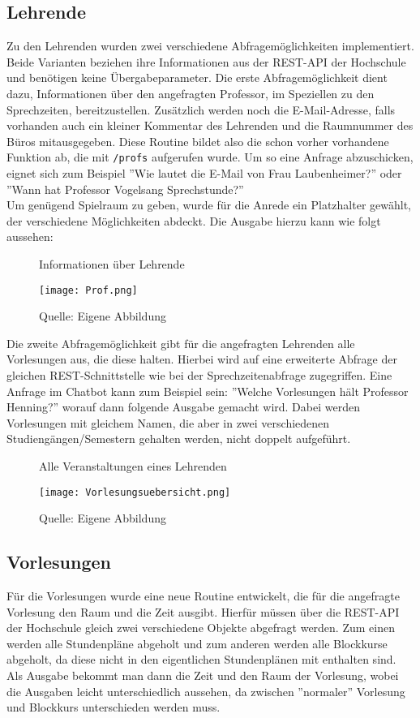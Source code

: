 \subsection{Lehrende}
Zu den Lehrenden wurden zwei verschiedene Abfragemöglichkeiten implementiert. Beide Varianten beziehen ihre Informationen aus der REST-API der Hochschule und benötigen keine Übergabeparameter. 
Die erste Abfragemöglichkeit dient dazu, Informationen über den angefragten Professor, im Speziellen zu den Sprechzeiten, bereitzustellen. Zusätzlich werden noch die E-Mail-Adresse, falls vorhanden auch ein kleiner Kommentar des Lehrenden und die Raumnummer des Büros mitausgegeben. Diese Routine bildet also die schon vorher vorhandene Funktion ab, die mit \texttt{/profs} aufgerufen wurde. Um so eine Anfrage abzuschicken, eignet sich zum Beispiel ''Wie lautet die E-Mail von Frau Laubenheimer?'' oder ''Wann hat Professor Vogelsang Sprechstunde?'' \\
Um genügend Spielraum zu geben, wurde für die Anrede ein Platzhalter gewählt, der verschiedene Möglichkeiten abdeckt. Die Ausgabe hierzu kann wie folgt aussehen:

\begin{figure}[H]
    \centering
    \caption{Informationen über Lehrende}
      \texttt{[image: Prof.png]}
      \label{img:profuebersicht}
    \caption*{Quelle: Eigene Abbildung}
\end{figure}

Die zweite Abfragemöglichkeit gibt für die angefragten Lehrenden alle Vorlesungen aus, die diese halten. Hierbei wird auf eine erweiterte Abfrage der gleichen REST-Schnittstelle wie bei der Sprechzeitenabfrage zugegriffen. Eine Anfrage im Chatbot kann zum Beispiel sein: ''Welche Vorlesungen hält Professor Henning?'' worauf dann folgende Ausgabe gemacht wird. Dabei werden Vorlesungen mit gleichem Namen, die aber in zwei verschiedenen Studiengängen/Semestern gehalten werden, nicht doppelt aufgeführt.

\begin{figure}[H]
    \centering
    \caption{Alle Veranstaltungen eines Lehrenden}
      \texttt{[image: Vorlesungsuebersicht.png]}
      \label{img:vorlesungsuebersicht}
    \caption*{Quelle: Eigene Abbildung}
\end{figure}

\subsection{Vorlesungen}
Für die Vorlesungen wurde eine neue Routine entwickelt, die für die angefragte Vorlesung den Raum und die Zeit ausgibt. Hierfür müssen über die REST-API der Hochschule gleich zwei verschiedene Objekte abgefragt werden. Zum einen werden alle Stundenpläne abgeholt und zum anderen werden alle Blockkurse abgeholt, da diese nicht in den eigentlichen Stundenplänen mit enthalten sind. Als Ausgabe bekommt man dann die Zeit und den Raum der Vorlesung, wobei die Ausgaben leicht unterschiedlich aussehen, da zwischen ''normaler'' Vorlesung und Blockkurs unterschieden werden muss.

